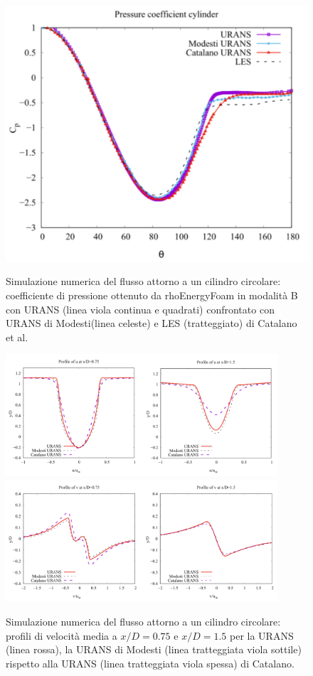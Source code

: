 \documentclass[a5paper]{sapthesis}
\begin{document}
	\begin{figure}[h]
		\begin{center}
			{\includegraphics[width=0.579\linewidth]{Figures/pressure_coeff_cylinder}}  
			\caption{Simulazione numerica del flusso attorno a un cilindro circolare: coefficiente di pressione ottenuto da rhoEnergyFoam in modalità B con URANS (linea viola continua e quadrati) confrontato con URANS di Modesti(linea celeste) e LES (tratteggiato) di Catalano et al. \cite{Catalano}}
			\label{Cp_Cylinder}
		\end{center}
	\end{figure}
	
	\begin{figure}[htp]
		\centering
		\subfloat
		{\includegraphics[width=0.9\textwidth, height=0.27\textheight]{Figures/Cylinder_u.pdf}} \quad 
		\subfloat
		\centering
		{\includegraphics[width=0.9\textwidth, height=0.27\textheight]{Figures/Cylinder_v}}
		\caption{Simulazione numerica del flusso attorno a un cilindro circolare: proﬁli di velocità media a $x/D = 0.75$ e $x/D = 1.5$ per la URANS (linea rossa), la URANS di Modesti (linea tratteggiata viola sottile) rispetto alla URANS (linea tratteggiata viola spessa) di Catalano.}
		\label{Cylinder}
	\end{figure}
	
\end{document}
